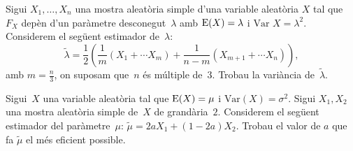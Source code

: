 \begin{prob}
{
Sigui $X_1,\ldots,X_{n}$ una mostra aleat\`oria simple d'una variable
aleat\`oria $X$ tal que $F_X$ dep\`en d'un par\`ametre
 desconegut~$\lambda$
amb ${\rm E} (X)=\lambda$ i $\mbox{Var }X=\lambda^2$. Considerem el
seg\"uent estimador de~$\lambda$:
$$
\tilde{\lambda}=
\frac{1}{2}\left(\frac{1}{m}(X_1+\cdots X_m)+\frac{1}{n-m}(X_{m+1}+
\cdots X_n)\right),$$
amb $m=\frac{n}{3}$, on suposam que~$n$ \'es m\'ultiple de~$3$.
Trobau la vari\`ancia de~$\tilde{\lambda}$.
}
\end{prob}

\begin{prob}
{Sigui~$X$ una variable aleat\`oria tal que ${\rm E} (X)=\mu$ i $\mbox{Var
}(X)=\sigma^2$. Sigui $X_1,X_2$ una mostra aleat\`oria simple de~$X$ de
grand\`aria~$2$. Considerem el seg\"uent estimador del par\`ametre~$\mu$:
$\tilde{\mu}=2 a X_1 + (1-2 a) X_2$. Trobau el valor de $a$ que fa 
$\tilde{\mu}$ el m\'es eficient possible.
}
\end{prob}


